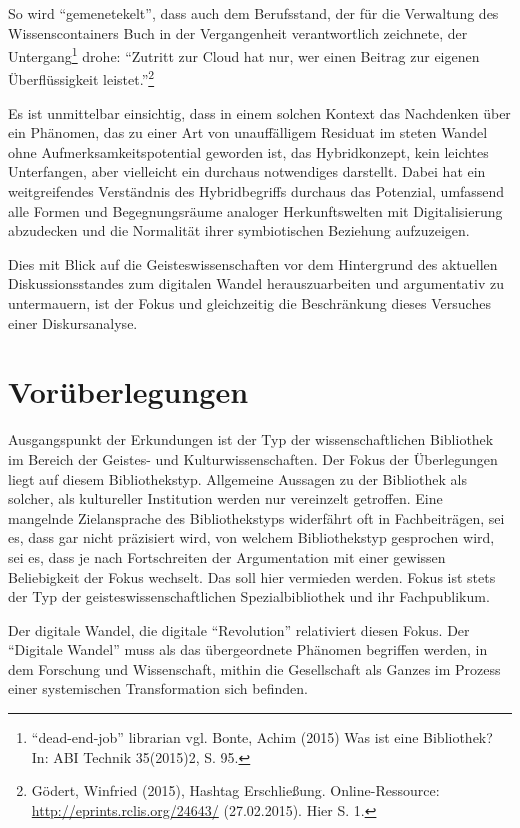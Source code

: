 \documentclass[a4paper,
fontsize=11pt,
oneside,
numbers=noperiodatend,
parskip=half-,
bibliography=totoc,
final
]{scrartcl}
\begin{document}
So wird \enquote{gemenetekelt}, dass auch dem Berufsstand, der für die
Verwaltung des Wissenscontainers Buch in der Vergangenheit
verantwortlich zeichnete, der Untergang\footnote{\enquote{dead-end-job}
  librarian vgl. Bonte, Achim (2015) Was ist eine Bibliothek? In: ABI
  Technik 35(2015)2, S. 95.} drohe: \enquote{Zutritt zur Cloud hat nur,
wer einen Beitrag zur eigenen Überflüssigkeit leistet.}\footnote{Gödert,
  Winfried (2015), Hashtag Erschließung. Online-Ressource:
  \url{http://eprints.rclis.org/24643/} (27.02.2015). Hier S. 1.}

Es ist unmittelbar einsichtig, dass in einem solchen Kontext das
Nachdenken über ein Phänomen, das zu einer Art von unauffälligem
Residuat im steten Wandel ohne Aufmerksamkeitspotential geworden ist,
das Hybridkonzept, kein leichtes Unterfangen, aber vielleicht ein
durchaus notwendiges darstellt. Dabei hat ein weitgreifendes Verständnis
des Hybridbegriffs durchaus das Potenzial, umfassend alle Formen und
Begegnungsräume analoger Herkunftswelten mit Digitalisierung abzudecken
und die Normalität ihrer symbiotischen Beziehung aufzuzeigen.

Dies mit Blick auf die Geisteswissenschaften vor dem Hintergrund des
aktuellen Diskussionsstandes zum digitalen Wandel herauszuarbeiten und
argumentativ zu untermauern, ist der Fokus und gleichzeitig die
Beschränkung dieses Versuches einer Diskursanalyse.

\section*{Vorüberlegungen}\label{voruxfcberlegungen}

Ausgangspunkt der Erkundungen ist der Typ der wissenschaftlichen
Bibliothek im Bereich der Geistes- und Kulturwissenschaften. Der Fokus
der Überlegungen liegt auf diesem Bibliothekstyp. Allgemeine Aussagen zu
der Bibliothek als solcher, als kultureller Institution werden nur
vereinzelt getroffen. Eine mangelnde Zielansprache des Bibliothekstyps
widerfährt oft in Fachbeiträgen, sei es, dass gar nicht präzisiert wird,
von welchem Bibliothekstyp gesprochen wird, sei es, dass je nach
Fortschreiten der Argumentation mit einer gewissen Beliebigkeit der
Fokus wechselt. Das soll hier vermieden werden. Fokus ist stets der Typ
der geisteswissenschaftlichen Spezialbibliothek und ihr Fachpublikum.

Der digitale Wandel, die digitale \enquote{Revolution} relativiert
diesen Fokus. Der \enquote{Digitale Wandel} muss als das übergeordnete
Phänomen begriffen werden, in dem Forschung und Wissenschaft, mithin die
Gesellschaft als Ganzes im Prozess einer systemischen Transformation
sich befinden.
\end{document}
